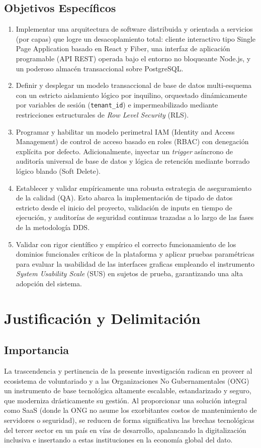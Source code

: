 \documentclass[11pt,a4paper,oneside]{report}
\begin{document}
\subsection{Objetivos Espec\'ificos}
\begin{enumerate}[label=\alph*.]
    \item Implementar una arquitectura de software distribuida y orientada a servicios (por capas) que logre un desacoplamiento total: cliente interactivo tipo Single Page Application basado en React y Fiber, una interfaz de aplicaci\'on programable (API REST) operada bajo el entorno no bloqueante Node.js, y un poderoso almac\'en transaccional sobre PostgreSQL.
    \item Definir y desplegar un modelo transaccional de base de datos multi-esquema con un estricto aislamiento l\'ogico por inquilino, orquestado din\'amicamente por variables de sesi\'on (\texttt{tenant\_id}) e impermeabilizado mediante restricciones estructurales de \textit{Row Level Security} (RLS).
    \item Programar y habilitar un modelo perimetral IAM (Identity and Access Management) de control de acceso basado en roles (RBAC) con denegaci\'on expl\'icita por defecto. Adicionalmente, inyectar un \textit{trigger} as\'incrono de auditor\'ia universal de base de datos y l\'ogica de retenci\'on mediante borrado l\'ogico blando (Soft Delete).
    \item Establecer y validar emp\'iricamente una robusta estrategia de aseguramiento de la calidad (QA). Esto abarca la implementaci\'on de tipado de datos estricto desde el inicio del proyecto, validaci\'on de inputs en tiempo de ejecuci\'on, y auditor\'ias de seguridad continuas trazadas a lo largo de las fases de la metodolog\'ia DDS.
    \item Validar con rigor cient\'ifico y emp\'irico el correcto funcionamiento de los dominios funcionales críticos de la plataforma y aplicar pruebas param\'etricas para evaluar la usabilidad de las interfaces graficas empleando el instrumento \textit{System Usability Scale} (SUS) en sujetos de prueba, garantizando una alta adopci\'on del sistema.
\end{enumerate}

\section{Justificaci\'on y Delimitaci\'on}
\subsection{Importancia}
La trascendencia y pertinencia de la presente investigaci\'on radican en proveer al ecosistema de voluntariado y a las Organizaciones No Gubernamentales (ONG) un instrumento de base tecnol\'ogica altamente escalable, estandarizado y seguro, que moderniza dr\'asticamente su gesti\'on. Al proporcionar una soluci\'on integral como SaaS (donde la ONG no asume los exorbitantes costos de mantenimiento de servidores o seguridad), se reducen de forma significativa las brechas tecnol\'ogicas del tercer sector en un pa\'is en v\'ias de desarrollo, apalancando la digitalizaci\'on inclusiva e insertando a estas instituciones en la econom\'ia global del dato.
\end{document}
